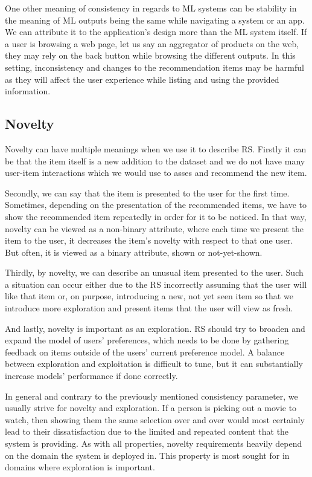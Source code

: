 One other meaning of consistency in regards to ML systems can be stability in the meaning of ML outputs being the same while navigating a system or an app. We can attribute it to the application's design more than the ML system itself. If a user is browsing a web page, let us say an aggregator of products on the web, they may rely on the back button while browsing the different outputs. In this setting, inconsistency and changes to the recommendation items may be harmful as they will affect the user experience while listing and using the provided information.

\subsection*{Novelty}
Novelty can have multiple meanings when we use it to describe RS. Firstly it can be that the item itself is a new addition to the dataset and we do not have many user-item interactions which we would use to asses and recommend the new item.

Secondly, we can say that the item is presented to the user for the first time. Sometimes, depending on the presentation of the recommended items, we have to show the recommended item repeatedly in order for it to be noticed. In that way, novelty can be viewed as a non-binary attribute, where each time we present the item to the user, it decreases the item's novelty with respect to that one user. But often, it is viewed as a binary attribute, shown or not-yet-shown.

Thirdly, by novelty, we can describe an unusual item presented to the user. Such a situation can occur either due to the RS incorrectly assuming that the user will like that item or, on purpose, introducing a new, not yet seen item so that we introduce more exploration and present items that the user will view as fresh.

And lastly, novelty is important as an exploration. RS should try to broaden and expand the model of users' preferences, which needs to be done by gathering feedback on items outside of the users' current preference model. A balance between exploration and exploitation is difficult to tune, but it can substantially increase models' performance if done correctly.

In general and contrary to the previously mentioned consistency parameter, we usually strive for novelty and exploration. If a person is picking out a movie to watch, then showing them the same selection over and over would most certainly lead to their dissatisfaction due to the limited and repeated content that the system is providing. As with all properties, novelty requirements heavily depend on the domain the system is deployed in. This property is most sought for in domains where exploration is important.





